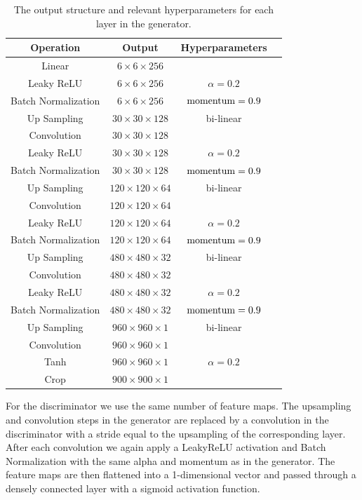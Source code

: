 \documentclass[twocolumn]{aastex62}
\begin{document}
\begin{table}[ht]
\centering

 \begin{tabular}{ c c c c }
 \hline\hline
  Operation & Output & Hyperparameters \rule{0pt}{2.5ex} \\ [0.5ex]
 \hline
  Linear & $6\times 6\times 256$  & \rule{0pt}{3.0ex} \\
  Leaky ReLU & $6\times 6\times 256$ & $\alpha=0.2$ \\
  Batch Normalization & $6\times 6\times 256$ & $\rm{momentum} = 0.9$ \\  
  Up Sampling & $30\times 30\times 128$ & bi-linear \\ 
  Convolution & $30\times 30\times 128$ &  \\
  Leaky ReLU & $30\times 30\times 128$ & $\alpha=0.2$ \\
  Batch Normalization & $30\times 30\times 128$ & $\rm{momentum} = 0.9$ \\  
  Up Sampling & $120\times 120\times 64$ & bi-linear \\ 
  Convolution & $120\times 120\times 64$ &  \\
  Leaky ReLU & $120\times 120\times 64$ & $\alpha=0.2$ \\ 
  Batch Normalization & $120\times 120\times 64$ & $\rm{momentum} = 0.9$ \\  
  Up Sampling & $480\times 480\times 32$ & bi-linear \\ 
  Convolution & $480\times 480\times 32$ &  \\
  Leaky ReLU & $480\times 480\times 32$ & $\alpha=0.2$ \\ 
  Batch Normalization & $480\times 480\times 32$ & $\rm{momentum} = 0.9$ \\  
  Up Sampling & $960\times 960\times 1$ & bi-linear \\ 
  Convolution & $960\times 960\times 1$ &  \\
  Tanh & $960\times 960\times 1$ & $\alpha=0.2$ \\
  Crop & $900\times 900\times 1$ &  \\ [1ex]
 \hline
\end{tabular}
\caption{The output structure and relevant hyperparameters for each layer in the generator.}
\label{tab:gan_layers}
\end{table}

For the discriminator we use the same number of feature maps. The upsampling and convolution steps in the generator are replaced by a convolution in the discriminator with a stride equal to the upsampling of the corresponding layer. After each convolution we again apply a LeakyReLU activation and Batch Normalization with the same alpha and momentum as in the generator. The feature maps are then flattened into a 1-dimensional vector and passed through a densely connected layer with a sigmoid activation function.
\end{document}
